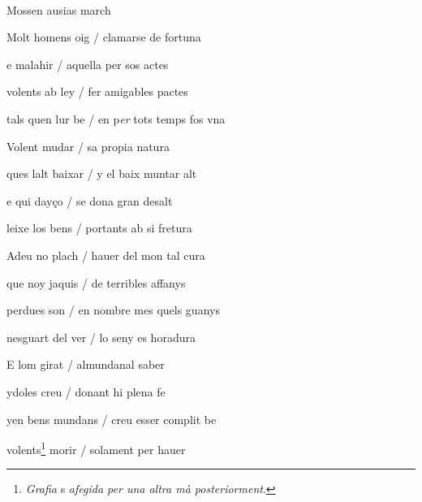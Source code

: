 \documentclass[12pt]{article}
\renewcommand{\espaiAbansEtiquetaPoema}{\vspace{0ex}}
\begin{document}
\begin{estrofa}

\espaiAbansEtiquetaPoema

\\

\begin{rubrica}

Mossen ausias march

\end{rubrica}

\end{estrofa}


\begin{estrofa}

 Molt homens oig / clamarse de fortuna

 e malahir / aquella per sos actes

 volents ab ley / fer amigables pactes

 tals quen lur be / en p\textit{er} tots temps fos vna

 Volent mudar / sa propia natura

 ques lalt baixar / y el baix muntar alt

 e qui day\c{c}o / se dona gran desalt

 leixe los bens / portants ab si fretura

\end{estrofa}



\begin{estrofa}

 Adeu no plach / hauer del mon tal cura

 que noy jaquis / de terribles affanys

 perdues son / en nombre mes quels guanys

 nesguart del ver / lo seny es horadura

 E lom girat / almundanal saber

 ydoles creu / donant hi plena fe

 yen bens mundans / creu esser complit be

 volents\footnote{\textit{Grafia} s \textit{afegida per una altra m\`{a}
posteriorment}.} morir / solament per hauer

\end{estrofa}
\end{document}
